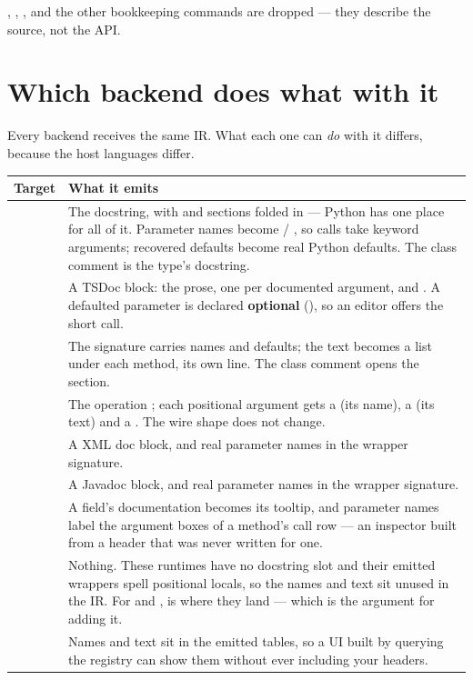 , , ,  and the other
bookkeeping commands are dropped --- they describe the source, not the API.

\section{Which backend does what with it}

Every backend receives the same IR. What each one can \emph{do} with it differs,
because the host languages differ.

\begin{center}
\small
\begin{tabular}{@{}lL{10.4cm}@{}}
\toprule
\textbf{Target} & \textbf{What it emits} \\
\midrule
{}  &
  The docstring, with  and  sections folded in ---
  Python has one place for all of it. Parameter names become
   / , so calls take keyword
  arguments; recovered defaults become real Python defaults. The class comment
  is the type's docstring. \\
\addlinespace
{} &
  A TSDoc block: the prose, one  per documented argument, and
  . A defaulted parameter is declared \textbf{optional}
  (), so an editor offers the short call. \\
\addlinespace
{}  &
  The signature carries names and defaults; the  text becomes a
  list under each method,  its own line. The class comment opens
  the section. \\
\addlinespace
{} &
  The operation ; each positional argument gets a
   (its name), a  (its  text) and a
  . The wire shape does not change. \\
\addlinespace
{} &
  A  XML doc block, and real parameter names in the wrapper
  signature. \\
\addlinespace
{} &
  A Javadoc block, and real parameter names in the wrapper signature. \\
\addlinespace
{}   &
  A field's documentation becomes its tooltip, and parameter names label the
  argument boxes of a method's call row --- an inspector built from a header
  that was never written for one. \\
\addlinespace
{}    &
  Nothing. These runtimes have no docstring slot and their emitted wrappers
  spell positional locals, so the names and text sit unused in the IR. For
   and ,  is where they land ---
  which is the argument for adding it. \\
\addlinespace
{} &
  Names and text sit in the emitted  tables, so a UI built by
  querying the registry can show them without ever including your headers. \\
\bottomrule
\end{tabular}
\end{center}

